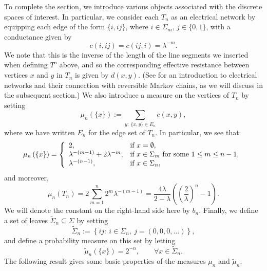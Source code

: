 \documentclass[a4paper, 11pt]{article}
\begin{document}
To complete the section, we introduce various objects associated with the discrete spaces of interest. In particular, we consider each $T_n$ as an electrical network by equipping each edge of the form $\{i,ij\}$, where $i\in\Sigma_m$, $j\in\{0,1\}$, with a conductance given by
\[c(i,ij)=c(ij,i)=\lambda^{-m}.\]
We note that this is the inverse of the length of the line segments we inserted when defining $T^o$ above, and so the corresponding effective resistance between vertices $x$ and $y$ in $T_n$ is given by $d(x,y)$. (See \cite[Chapter 9]{LPW} for an introduction to electrical networks and their connection with reversible Markov chains, as we will discuss in the subsequent section.) We also introduce a measure on the vertices of $T_n$ by setting
\[\mu_{n}\left(\{x\}\right):=\sum_{y:\:\{x,y\}\in E_n}c(x,y),\]
where we have written $E_n$ for the edge set of $T_n$. In particular, we see that:
\[\mu_{n}\left(\{x\}\right)=\left\{
                              \begin{array}{ll}
                                2, & \hbox{if $x=\emptyset$,} \\
                                \lambda^{-(m-1)}+2\lambda^{-m}, & \hbox{if $x\in \Sigma_m$ for some $1\leq m\leq n-1$,} \\
                                \lambda^{-(n-1)}, & \hbox{if $x\in \Sigma_n$,}
                              \end{array}
                            \right.\]
and moreover,
\[\mu_{n}\left(T_n\right)=2\sum_{m=1}^n2^m\lambda^{-(m-1)}=\frac{4\lambda}{2-\lambda}\left(\left(\frac{2}{\lambda}\right)^n-1\right).\]
We will denote the constant on the right-hand side here by $b_n$. Finally, we define a set of leaves $\tilde{\Sigma}_n\subseteq\Sigma$ by setting
\[\tilde{\Sigma}_n:=\left\{ij:\:i\in \Sigma_n,\: j=(0,0,0,\dots)\right\},\]
and define a probability measure on this set by letting
\[\tilde{\mu}_n\left(\{x\}\right)=2^{-n},\qquad \forall x\in \tilde{\Sigma}_n.\]
The following result gives some basic properties of the measures $\mu_{n}$ and $\tilde{\mu}_n$.
\end{document}
